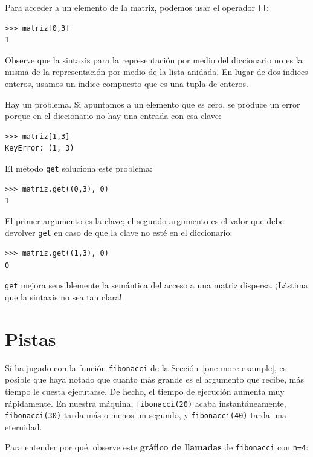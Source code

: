 Para acceder a un elemento de la matriz, podemos usar el operador
\texttt{{[}{]}}:
\begin{lstlisting}
>>> matriz[0,3]
1
\end{lstlisting}
Observe que la sintaxis para la representación por medio del diccionario
no es la misma de la representación por medio de la lista anidada.
En lugar de dos índices enteros, usamos un índice compuesto que es
una tupla de enteros.

Hay un problema. Si apuntamos a un elemento que es cero, se produce
un error porque en el diccionario no hay una entrada con esa clave:

\begin{lstlisting}
>>> matriz[1,3]
KeyError: (1, 3)
\end{lstlisting}
El método \texttt{get} soluciona este problema:
\begin{lstlisting}
>>> matriz.get((0,3), 0)
1
\end{lstlisting}
El primer argumento es la clave; el segundo argumento es el valor
que debe devolver \texttt{get} en caso de que la clave no esté en
el diccionario:
\begin{lstlisting}
>>> matriz.get((1,3), 0)
0
\end{lstlisting}
\texttt{get} mejora sensiblemente la semántica del acceso a una matriz
dispersa. ¡Lástima que la sintaxis no sea tan clara!

\section{Pistas}

 

Si ha jugado con la función \texttt{fibonacci} de la Sección~\ref{one more example},
es posible que haya notado que cuanto más grande es el argumento que
recibe, más tiempo le cuesta ejecutarse. De hecho, el tiempo de ejecución
aumenta muy rápidamente. En nuestra máquina, \texttt{fibonacci(20)}
acaba instantáneamente, \texttt{fibonacci(30)} tarda más o menos un
segundo, y \texttt{fibonacci(40)} tarda una eternidad.

Para entender por qué, observe este \textbf{gráfico de llamadas} de
\texttt{fibonacci} con \texttt{n=4}:

